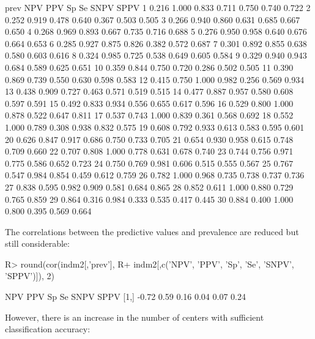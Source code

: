 \documentclass[
  nojss]{jss}
\begin{document}
\begin{CodeChunk}
\begin{CodeOutput}
    prev   NPV   PPV    Sp    Se  SNPV  SPPV
1  0.216 1.000 0.833 0.711 0.750 0.740 0.722
2  0.252 0.919 0.478 0.640 0.367 0.503 0.505
3  0.266 0.940 0.860 0.631 0.685 0.667 0.650
4  0.268 0.969 0.893 0.667 0.735 0.716 0.688
5  0.276 0.950 0.958 0.640 0.676 0.664 0.653
6  0.285 0.927 0.875 0.826 0.382 0.572 0.687
7  0.301 0.892 0.855 0.638 0.580 0.603 0.616
8  0.324 0.985 0.725 0.538 0.649 0.605 0.584
9  0.329 0.940 0.943 0.684 0.589 0.625 0.651
10 0.359 0.844 0.750 0.720 0.286 0.502 0.505
11 0.390 0.869 0.739 0.550 0.630 0.598 0.583
12 0.415 0.750 1.000 0.982 0.256 0.569 0.934
13 0.438 0.909 0.727 0.463 0.571 0.519 0.515
14 0.477 0.887 0.957 0.580 0.608 0.597 0.591
15 0.492 0.833 0.934 0.556 0.655 0.617 0.596
16 0.529 0.800 1.000 0.878 0.522 0.647 0.811
17 0.537 0.743 1.000 0.839 0.361 0.568 0.692
18 0.552 1.000 0.789 0.308 0.938 0.832 0.575
19 0.608 0.792 0.933 0.613 0.583 0.595 0.601
20 0.626 0.847 0.917 0.686 0.750 0.733 0.705
21 0.654 0.930 0.958 0.615 0.748 0.709 0.660
22 0.707 0.808 1.000 0.778 0.631 0.678 0.740
23 0.744 0.756 0.971 0.775 0.586 0.652 0.723
24 0.750 0.769 0.981 0.606 0.515 0.555 0.567
25 0.767 0.547 0.984 0.854 0.459 0.612 0.759
26 0.782 1.000 0.968 0.735 0.738 0.737 0.736
27 0.838 0.595 0.982 0.909 0.581 0.684 0.865
28 0.852 0.611 1.000 0.880 0.729 0.765 0.859
29 0.864 0.316 0.984 0.333 0.535 0.417 0.445
30 0.884 0.400 1.000 0.800 0.395 0.569 0.664
\end{CodeOutput}
\end{CodeChunk}

The correlations between the predictive values and prevalence are
reduced but still considerable:

\begin{CodeChunk}

\begin{CodeInput}
R> round(cor(indm2[,'prev'], 
R+           indm2[,c('NPV', 'PPV', 'Sp', 'Se', 'SNPV', 'SPPV')]), 2)
\end{CodeInput}

\begin{CodeOutput}
       NPV  PPV   Sp   Se SNPV SPPV
[1,] -0.72 0.59 0.16 0.04 0.07 0.24
\end{CodeOutput}
\end{CodeChunk}

However, there is an increase in the number of centers with sufficient
classification accuracy:
\end{document}
